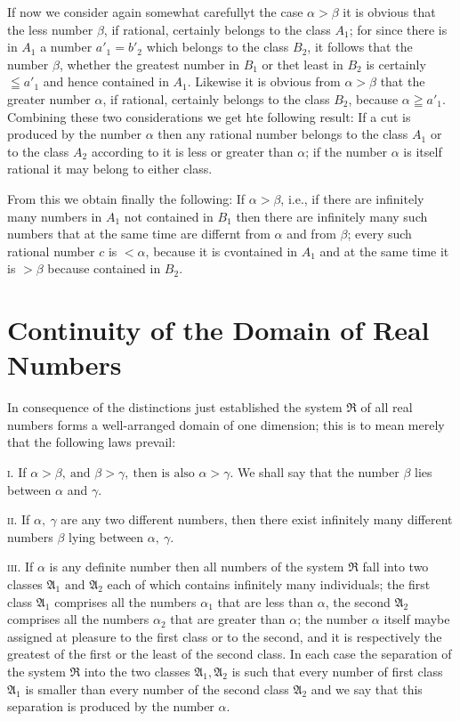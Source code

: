\documentclass[oneside,12pt]{book}
\begin{document}
If now we consider again somewhat carefullyt the case $\alpha > \beta$ it is obvious that the less number $\beta$, if rational, certainly belongs to the class $A_1$; for since there is in $A_1$ a number $a'_1=b'_2$ which belongs to the class $B_2$, it follows that the number $\beta$, whether the greatest number in $B_1$ or thet least in $B_2$ is certainly $\leqq a'_1$ and hence contained in $A_1$. Likewise it is obvious from $\alpha > \beta$ that the greater number $\alpha$, if rational, certainly belongs to the class $B_2$, because $\alpha \geqq a'_1$. Combining these two considerations we get hte following result: If a cut is produced by the number $\alpha$ then any rational number belongs to the class $A_1$ or to the class $A_2$ according to it is less or greater than $\alpha$; if the number $\alpha$ is itself rational it may belong to either class. \par 

From this we obtain finally the following: If $\alpha > \beta$, i.e., if there are infinitely many numbers in $A_1$ not contained in $B_1$ then there are infinitely many such numbers that at the same time are differnt from $\alpha$ and from $\beta$; every such rational number $c$ is $< \alpha$, because it is cvontained in $A_1$ and at the same time it is $> \beta$ because contained in $B_2$. \par 

\section{Continuity of the Domain of Real Numbers}
In consequence of the distinctions just established the system $\mathfrak{R}$ of all real numbers forms a well-arranged domain of one dimension; this is to mean merely that the following laws prevail: \par 

\textsc{i.} If $\alpha > \beta,\ \text{and } \beta > \gamma,\ \text{then is also } \alpha > \gamma$. We shall say that the number $\beta$ lies between $\alpha$ and $\gamma$. \par

\textsc{ii.} If $\alpha,\ \gamma$ are any two different numbers, then there exist infinitely many different numbers $\beta$ lying between $\alpha,\ \gamma$. \par 

\textsc{iii.} If $\alpha$ is any definite number then all numbers of the system $\Re$ fall into two classes $\mathfrak{A}_1 \text{ and } \mathfrak{A}_2$ each of which contains infinitely many individuals; the first class $\mathfrak{A}_1$ comprises all the numbers $\alpha_1$ that are less than $\alpha$, the second $\mathfrak{A}_2$ comprises all the numbers $\alpha_2$ that are greater than $\alpha$; the number $\alpha$ itself maybe assigned at pleasure to the first class or to the second, and it is respectively the greatest of the first or the least of the second class. In each case the separation of the system $\Re$ into the two classes $\mathfrak{A}_1,\mathfrak{A}_2$ is such that every number of first class $\mathfrak{A}_1$ is smaller than every number of the second class $\mathfrak{A}_2$ and we say that this separation is produced by the number $\alpha$. \par 
\end{document}
